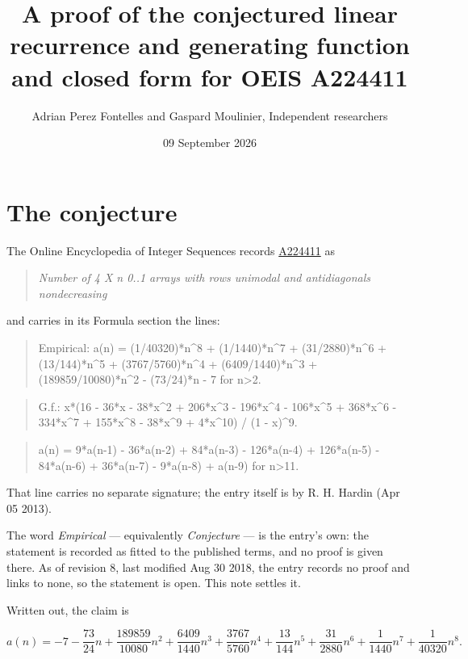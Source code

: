 \documentclass[11pt]{article}
\title{A proof of the conjectured linear recurrence and generating function and closed form for OEIS A224411}
\author{Adrian Perez Fontelles and Gaspard Moulinier, Independent researchers}
\date{09 September 2026}
\theoremstyle{definition}
\begin{document}
\maketitle
\section{The conjecture}

The Online Encyclopedia of Integer Sequences records \href{https://oeis.org/A224411}{A224411} as

\begin{quote}\itshape Number of 4 X n 0..1 arrays with rows unimodal and antidiagonals nondecreasing\end{quote}

and carries in its Formula section the lines:

\begin{quote}\ttfamily Empirical: a(n) = (1/40320)*n\textasciicircum{}8 + (1/1440)*n\textasciicircum{}7 + (31/2880)*n\textasciicircum{}6 + (13/144)*n\textasciicircum{}5 + (3767/5760)*n\textasciicircum{}4 + (6409/1440)*n\textasciicircum{}3 + (189859/10080)*n\textasciicircum{}2 - (73/24)*n - 7 for n>2.\end{quote}

\begin{quote}\ttfamily G.f.: x*(16 - 36*x - 38*x\textasciicircum{}2 + 206*x\textasciicircum{}3 - 196*x\textasciicircum{}4 - 106*x\textasciicircum{}5 + 368*x\textasciicircum{}6 - 334*x\textasciicircum{}7 + 155*x\textasciicircum{}8 - 38*x\textasciicircum{}9 + 4*x\textasciicircum{}10) / (1 - x)\textasciicircum{}9.\end{quote}

\begin{quote}\ttfamily a(n) = 9*a(n-1) - 36*a(n-2) + 84*a(n-3) - 126*a(n-4) + 126*a(n-5) - 84*a(n-6) + 36*a(n-7) - 9*a(n-8) + a(n-9) for n>11.\end{quote}

That line carries no separate signature; the entry itself is by R. H. Hardin (Apr 05 2013).

The word {\itshape Empirical} --- equivalently {\itshape Conjecture} --- is the entry's own: the statement is recorded as fitted to the published terms, and no proof is given there. As of revision 8, last modified Aug 30 2018, the entry records no proof and links to none, so the statement is open. This note settles it.

Written out, the claim is

\[a(n) = -7 - \frac{73}{24}n + \frac{189859}{10080}n^{2} + \frac{6409}{1440}n^{3} + \frac{3767}{5760}n^{4} + \frac{13}{144}n^{5} + \frac{31}{2880}n^{6} + \frac{1}{1440}n^{7} + \frac{1}{40320}n^{8}.\]
\end{document}
